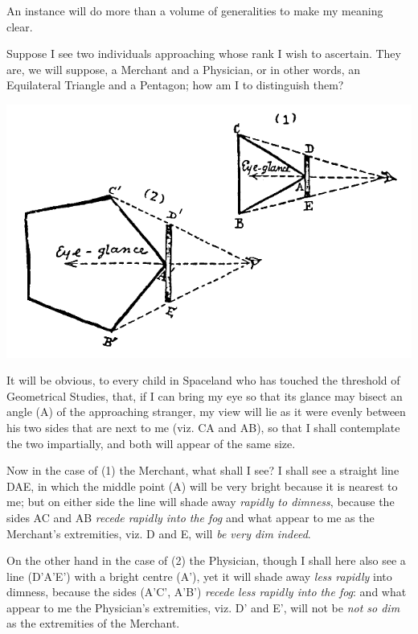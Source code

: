 \documentclass[10pt, kindle, oneside]{kindle}
\begin{document}
An instance will do more than a volume of generalities to make my meaning
clear.

Suppose I see two individuals approaching whose rank I wish to ascertain. They
are, we will suppose, a Merchant and a Physician, or in other words, an
Equilateral Triangle and a Pentagon; how am I to distinguish them?

\includegraphics[trim=0mm 0mm 0mm 0mm, width=\linewidth]{fig3}

It will be obvious, to every child in Spaceland who has touched the threshold
of Geometrical Studies, that, if I can bring my eye so that its glance may
bisect an angle (A) of the approaching stranger, my view will lie as it were
evenly between his two sides that are next to me (viz. CA and AB), so that I
shall contemplate the two impartially, and both will appear of the same size.

Now in the case of (1) the Merchant, what shall I see? I shall see a straight
line DAE, in which the middle point (A) will be very bright because it is
nearest to me; but on either side the line will shade away \emph{rapidly to dimness},
because the sides AC and AB \emph{recede rapidly into the fog} and what appear to me
as the Merchant's extremities, viz. D and E, will \emph{be very dim indeed}.

On the other hand in the case of (2) the Physician, though I shall here also
see a line (D'A'E') with a bright centre (A'), yet it will shade away \emph{less
rapidly} into dimness, because the sides (A'C', A'B') \emph{recede less rapidly into
the fog}: and what appear to me the Physician's extremities, viz. D' and E',
will not be \emph{not so dim} as the extremities of the Merchant.
\end{document}
